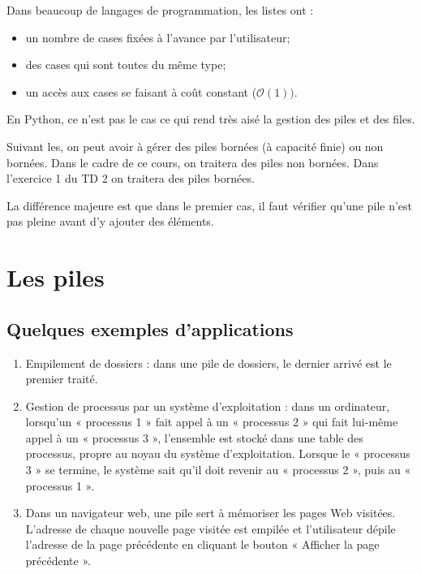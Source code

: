 \documentclass[10pt,fleqn]{article} %
\begin{document}
Dans beaucoup de langages de programmation, les listes ont :
\begin{itemize}
\item un nombre de cases fixées à l'avance par l'utilisateur;
\item des cases qui sont toutes du même type;
\item un accès aux cases se faisant à coût constant ($\mathcal{O}(1))$.
\end{itemize}

En Python, ce n'est pas le cas ce qui rend très aisé la gestion des piles et des files. 

\begin{rem}
 Suivant les, on peut avoir à gérer des piles bornées (à capacité finie) ou non bornées. Dans le cadre de ce cours, on traitera des piles non bornées. Dans l'exercice 1 du TD 2 on traitera des piles bornées. 

La différence majeure est  que dans le premier cas, il faut vérifier qu'une pile n'est pas pleine avant d'y ajouter des éléments. 
\end{rem}

\section{Les piles}
\subsection{Quelques exemples d'applications}

\begin{enumerate}
\item Empilement de dossiers : dans une pile de dossiers, le dernier arrivé est le premier traité.

\item Gestion de processus par un système d’exploitation : dans un ordinateur, lorsqu’un « processus 1 » fait appel à un « processus 2 » qui fait lui-même appel à un « processus 3 », l’ensemble est stocké dans une table des processus, propre au noyau du système d’exploitation. Lorsque le « processus 3 » se termine, le système sait qu’il doit revenir au « processus 2 », puis au « processus 1 ». 
\item Dans un navigateur web, une pile sert à mémoriser les pages Web visitées. L'adresse de chaque nouvelle page visitée est empilée et l'utilisateur dépile l'adresse de la page précédente en cliquant le bouton « Afficher la page précédente ».
\end{enumerate}
\end{document}
